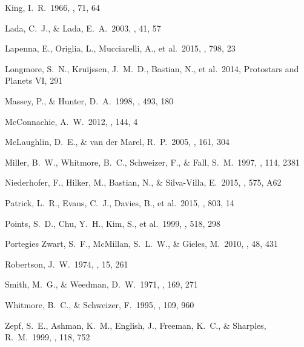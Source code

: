 \documentclass[useAMS,usenatbib]{mn2e}
\begin{document}
\begin{thebibliography}{99}
 King, I.~R.\ 1966, \aj, 71, 64

 Lada, C.~J., \& Lada, E.~A.\ 2003, \araa, 41, 57

 Lapenna, E., Origlia,
L., Mucciarelli, A., et al.\ 2015, \apj, 798, 23

 Longmore, S.~N.,
Kruijssen, J.~M.~D., Bastian, N., et al.\ 2014, Protostars and Planets VI,
291

 Massey, P., \& Hunter, D.~A.\ 1998, \apj, 493, 180

 McConnachie, A.~W.\ 2012,
\aj, 144, 4

 McLaughlin, D.~E., \& van der Marel, R.~P.\ 2005, \apjs, 161, 304

 Miller, B.~W., Whitmore,
B.~C., Schweizer, F., \& Fall, S.~M.\ 1997, \aj, 114, 2381

 Niederhofer, F., Hilker, M., Bastian, N., \& Silva-Villa, E.\ 2015, \aap, 575, A62

 Patrick, L.~R., Evans,
C.~J., Davies, B., et al.\ 2015, \apj, 803, 14

 Points, S.~D., Chu,
Y.~H., Kim, S., et al.\ 1999, \apj, 518, 298

 Portegies Zwart, S.~F., McMillan, S.~L.~W., \& Gieles, M.\ 2010, \araa, 48, 431

 Robertson, J.~W.\ 1974, \aaps, 15, 261

 Smith, M.~G., \& Weedman, D.~W.\ 1971, \apj, 169, 271

 Whitmore, B.~C., \& Schweizer, F.\ 1995, \aj, 109, 960

 Zepf, S.~E., Ashman,
K.~M., English, J., Freeman, K.~C., \& Sharples, R.~M.\ 1999, \aj, 118, 752
\end{thebibliography}
\label{lastpage}
\end{document}
